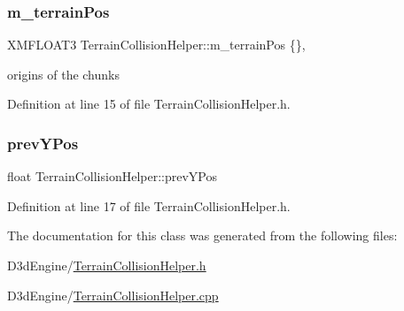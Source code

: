 \subsubsection{\texorpdfstring{m\+\_\+terrain\+Pos}{m\_terrainPos}}
{\footnotesize\ttfamily X\+M\+F\+L\+O\+A\+T3 Terrain\+Collision\+Helper\+::m\+\_\+terrain\+Pos \{\}\hspace{0.3cm}{\ttfamily [static]}, {\ttfamily [private]}}



origins of the chunks 



Definition at line 15 of file Terrain\+Collision\+Helper.\+h.

\mbox{\label{class_terrain_collision_helper_a3418ac5abfc56f291e2ca54a8661513a}} 
\subsubsection{\texorpdfstring{prev\+Y\+Pos}{prevYPos}}
{\footnotesize\ttfamily float Terrain\+Collision\+Helper\+::prev\+Y\+Pos\hspace{0.3cm}{\ttfamily [private]}}



Definition at line 17 of file Terrain\+Collision\+Helper.\+h.



The documentation for this class was generated from the following files\+:\begin{DoxyCompactItemize}
\item 
D3d\+Engine/\mbox{\hyperlink{_terrain_collision_helper_8h}{Terrain\+Collision\+Helper.\+h}}\item 
D3d\+Engine/\mbox{\hyperlink{_terrain_collision_helper_8cpp}{Terrain\+Collision\+Helper.\+cpp}}\end{DoxyCompactItemize}
